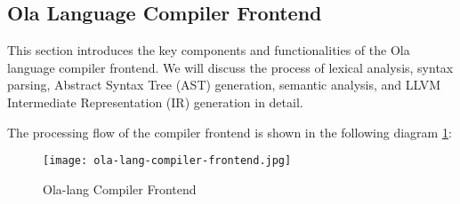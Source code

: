 \subsection{Ola Language Compiler Frontend}

This section introduces the key components and functionalities of the Ola language compiler frontend. We will discuss the process of lexical analysis, syntax parsing, Abstract Syntax Tree (AST) generation, semantic analysis, and LLVM Intermediate Representation (IR) generation in detail.

The processing flow of the compiler frontend is shown in the following diagram \ref{fig:ola-lang-compiler-frontend}:

\begin{figure}[!ht]
    \centering
    \texttt{[image: ola-lang-compiler-frontend.jpg]}
    \caption{Ola-lang Compiler Frontend}
    \label{fig:ola-lang-compiler-frontend}
\end{figure}





